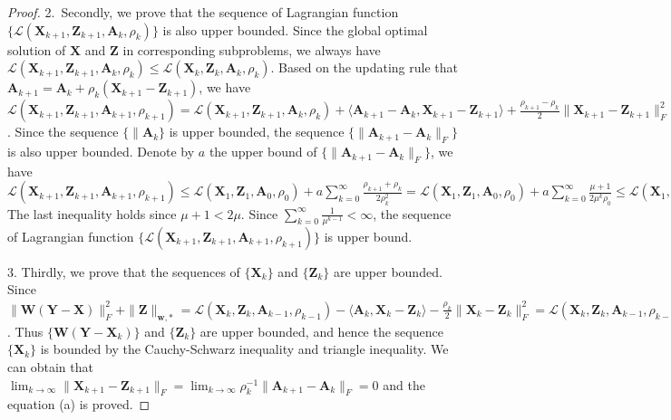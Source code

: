 \documentclass[10pt,onecolumn,letterpaper]{article}
\begin{document}
\begin{proof}
2.\ Secondly, we prove that the sequence of Lagrangian function $\{\mathcal{L}(\mathbf{X}_{k+1},\mathbf{Z}_{k+1},\mathbf{A}_{k},\rho_{k})\}$ is also upper bounded. Since the global optimal solution of $\mathbf{X}$ and $\mathbf{Z}$ in corresponding subproblems, we always have 
$
\mathcal{L}(\mathbf{X}_{k+1},\mathbf{Z}_{k+1},\mathbf{A}_{k},\rho_{k})
\le
\mathcal{L}(\mathbf{X}_{k},\mathbf{Z}_{k},\mathbf{A}_{k},\rho_{k}).
$
Based on the updating rule that 
$
\mathbf{A}_{k+1}
=
\mathbf{A}_{k} + \rho_{k}(\mathbf{X}_{k+1}-\mathbf{Z}_{k+1})
$,
we have 
$
\mathcal{L}(\mathbf{X}_{k+1},\mathbf{Z}_{k+1},\mathbf{A}_{k+1},\rho_{k+1})
=
\mathcal{L}(\mathbf{X}_{k+1},\mathbf{Z}_{k+1},\mathbf{A}_{k},\rho_{k})
+
\langle
\mathbf{A}_{k+1}
-
\mathbf{A}_{k}
,
\mathbf{X}_{k+1}
-
\mathbf{Z}_{k+1}
\rangle
+
\frac{\rho_{k+1}-\rho_{k}}{2}
\|
\mathbf{X}_{k+1}-\mathbf{Z}_{k+1}
\|_{F}^{2}
=
\mathcal{L}(\mathbf{X}_{k+1},\mathbf{Z}_{k+1},\mathbf{A}_{k},\rho_{k})
+
\frac{\rho_{k+1}+\rho_{k}}{2\rho_{k}^{2}}
\|
\mathbf{A}_{k+1}
-
\mathbf{A}_{k}
\|_{F}^{2}
$.
Since the sequence 
$\{\|
\mathbf{A}_{k}\}$
is upper bounded, the sequence 
$\{\|
\mathbf{A}_{k+1}
-
\mathbf{A}_{k}
\|_{F}\}$ is also upper bounded. Denote by $a$ the upper bound of 
$\{\|
\mathbf{A}_{k+1}
-
\mathbf{A}_{k}
\|_{F}\}$, 
we have 
$
\mathcal{L}(\mathbf{X}_{k+1},\mathbf{Z}_{k+1},\mathbf{A}_{k+1},\rho_{k+1})
\le
\mathcal{L}(\mathbf{X}_{1},\mathbf{Z}_{1},\mathbf{A}_{0},\rho_{0})
+
a\sum_{k=0}^{\infty}\frac{\rho_{k+1}+\rho_{k}}{2\rho_{k}^{2}}
=
\mathcal{L}(\mathbf{X}_{1},\mathbf{Z}_{1},\mathbf{A}_{0},\rho_{0})
+
a\sum_{k=0}^{\infty}\frac{\mu+1}{2\mu^{k}\rho_{0}}
\le
\mathcal{L}(\mathbf{X}_{1},\mathbf{Z}_{1},\mathbf{A}_{0},\rho_{0})
+
\frac{a}{\rho_{0}}\sum_{k=0}^{\infty}\frac{1}{\mu^{k-1}}.
$
The last inequality holds since $\mu+1<2\mu$. Since $\sum_{k=0}^{\infty}\frac{1}{\mu^{k-1}}<\infty$, the sequence of Lagrangian function 
$\{\mathcal{L}(\mathbf{X}_{k+1},\mathbf{Z}_{k+1},\mathbf{A}_{k+1},\rho_{k+1})\}$
is upper bound.

3. Thirdly, we prove that the sequences of 
$\{\mathbf{X}_{k}\}$ and $\{\mathbf{Z}_{k}\}$ are upper bounded. Since 
$\|\mathbf{W}(\mathbf{Y}-\mathbf{X})\|_{F}^{2}
+
\|\mathbf{Z}\|_{\bm{w},*}
=
\mathcal{L}(\mathbf{X}_{k},\mathbf{Z}_{k},\mathbf{A}_{k-1},\rho_{k-1})
-
\langle
\mathbf{A}_{k},
\mathbf{X}_{k}-\mathbf{Z}_{k}
\rangle
-
\frac{\rho_{k}}{2}
\|
\mathbf{X}_{k}-\mathbf{Z}_{k}
\|_{F}^{2}
=
\mathcal{L}(\mathbf{X}_{k},\mathbf{Z}_{k},\mathbf{A}_{k-1},\rho_{k-1})
+
\frac{1}{2\rho_{k}}
(
\|
\mathbf{A}_{k-1}
\|_{F}^{2}
-
\|
\mathbf{A}_{k}
\|_{F}^{2}
)
$.
Thus $\{\mathbf{W}(\mathbf{Y}-\mathbf{X}_{k})\}$ and $\{\mathbf{Z}_{k}\}$ are upper bounded, and hence
the sequence $\{\mathbf{X}_{k}\}$ is bounded by the Cauchy-Schwarz inequality and triangle inequality.
We can obtain that 
$
\lim_{k \to \infty} 
\|\mathbf{X}_{k+1}-\mathbf{Z}_{k+1}\|_{F}
=
\lim_{k \to \infty} 
\rho_{k}^{-1}
\|
\mathbf{A}_{k+1}
-
\mathbf{A}_{k}
\|_{F}
=
0
$ and the equation (a) is proved.


\end{proof}
\end{document}
